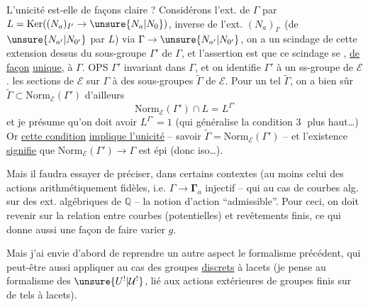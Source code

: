 L'unicité est-elle de  façons claire ?
 Considérons l'ext.  de
$\Gamma$ par $L=\mathrm{Ker}((N_a)_{I'}\to\unsure{N_a|N_0})$,
 inverse de l'ext. $(N_a)_{I'}$
(de $\unsure{N_{a'}|N_{0'}}$ par $L$) via $\Gamma\to\unsure{N_{a'}|N_{0'}}$, on
a un scindage  de cette extension  dessus
du sous-groupe $\Gamma'$ de $\Gamma$, et l'assertion est
que ce scindage se \uline{}, \uline{de façon} \uline{unique}, à $\Gamma$.
OPS $\Gamma'$ invariant dans $\Gamma$, et on
identifie $\Gamma'$ à un ss-groupe de $\mathcal{E}$. 
 les sections de $\mathcal{E}$ sur $\Gamma$ 
à des sous-groupes  $\widetilde{\Gamma}$ de $\mathcal{E}$.
Pour un tel $\widetilde{\Gamma}$, on a bien sûr
$\widetilde{\Gamma}\subset\mathrm{Norm}_{\mathcal{E}}(\Gamma')$
d'ailleurs  
\[
\mathrm{Norm}_{\mathcal{E}}(\Gamma')\cap L=L^{\Gamma'} \tag{31}
\]
et je présume qu'on doit avoir
$L^{\Gamma'}=1$ (qui généralise la condition
\textcircled{3} plus haut\ldots) Or \uline{cette condition}
\uline{implique l'unicité} -- savoir
$\widetilde{\Gamma}=\mathrm{Norm}_{\mathcal{E}}(\Gamma')$ --
et l'existence \uline{signifie} que
$\mathrm{Norm}_{\mathcal{E}}(\Gamma')\to\Gamma$
est épi (donc iso\ldots).

Mais il faudra essayer de préciser,
dans certains contextes (au moins celui des
actions arithmétiquement fidèles, i.e. $\Gamma\to\boldsymbol{\Gamma}_a$
injectif -- qui  
au cas de courbes alg.  sur des
ext. algébriques de $\mathbb{Q}$ -- la notion
d'action ``admissible''. Pour ceci, on
doit revenir sur la relation entre
courbes (potentielles) et revêtements finis,
ce qui donne aussi une façon de
faire varier $g$.

Mais j'ai envie d'abord de reprendre
 un autre aspect  le formalisme
précédent, qui  peut-être aussi appliquer au cas des groupes \uline{discrets}
à lacets (je pense au formalisme
des $\unsure{U^!|\mathcal{U}^!}$, lié aux actions extérieures de
groupes finis sur de tels  à lacets).

